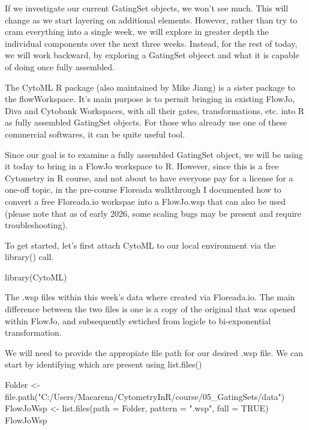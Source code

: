 \documentclass[
  letterpaper,
  DIV=11,
  numbers=noendperiod]{scrartcl}
\newenvironment{Shaded}{\begin{snugshade}}{\end{snugshade}}
\newcommand{\AttributeTok}[1]{\textcolor[rgb]{0.40,0.45,0.13}{#1}}
\newcommand{\ConstantTok}[1]{\textcolor[rgb]{0.56,0.35,0.01}{#1}}
\newcommand{\FunctionTok}[1]{\textcolor[rgb]{0.28,0.35,0.67}{#1}}
\newcommand{\NormalTok}[1]{\textcolor[rgb]{0.00,0.23,0.31}{#1}}
\newcommand{\OtherTok}[1]{\textcolor[rgb]{0.00,0.23,0.31}{#1}}
\newcommand{\StringTok}[1]{\textcolor[rgb]{0.13,0.47,0.30}{#1}}
\begin{document}
If we investigate our current GatingSet objects, we won't see much. This
will change as we start layering on additional elements. However, rather
than try to cram everything into a single week, we will explore in
greater depth the individual components over the next three weeks.
Instead, for the rest of today, we will work backward, by exploring a
GatingSet objecct and what it is capable of doing once fully assembled.

The CytoML R package (also maintained by Mike Jiang) is a sister package
to the flowWorkspace. It's main purpose is to permit bringing in
existing FlowJo, Diva and Cytobank Workspaces, with all their gates,
transformations, etc. into R as fully assembled GatingSet objects. For
those who already use one of these commercial softwares, it can be quite
useful tool.

Since our goal is to examine a fully assembled GatingSet object, we will
be using it today to bring in a FlowJo workspace to R. However, since
this is a free Cytometry in R course, and not about to have everyone pay
for a license for a one-off topic, in the pre-course Floreada
walkthrough I documented how to convert a free Floreada.io workspae into
a FlowJo.wsp that can also be used (please note that as of early 2026,
some scaling bugs may be present and require troubleshooting).

To get started, let's first attach CytoML to our local environment via
the library() call.

\begin{Shaded}
\begin{Highlighting}[]
\FunctionTok{library}\NormalTok{(CytoML)}
\end{Highlighting}
\end{Shaded}

The .wsp files within this week's data where created via Floreada.io.
The main difference between the two files is one is a copy of the
original that was opened within FlowJo, and subsequently swtiched from
logicle to bi-exponential transformation.

We will need to provide the appropiate file path for our desired .wsp
file. We can start by identifying which are present using list.files()

\begin{Shaded}
\begin{Highlighting}[]
\NormalTok{Folder }\OtherTok{\textless{}{-}} \FunctionTok{file.path}\NormalTok{(}\StringTok{"C:/Users/Macarena/CytometryInR/course/05\_GatingSets/data"}\NormalTok{)}
\NormalTok{FlowJoWsp }\OtherTok{\textless{}{-}} \FunctionTok{list.files}\NormalTok{(}\AttributeTok{path =}\NormalTok{ Folder, }\AttributeTok{pattern =} \StringTok{".wsp"}\NormalTok{, }\AttributeTok{full =} \ConstantTok{TRUE}\NormalTok{)}
\NormalTok{FlowJoWsp}
\end{Highlighting}
\end{Shaded}
\end{document}

